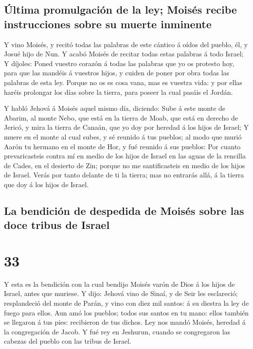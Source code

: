 \hypertarget{uxfaltima-promulgaciuxf3n-de-la-ley-moisuxe9s-recibe-instrucciones-sobre-su-muerte-inminente}{%
\subsection{Última promulgación de la ley; Moisés recibe instrucciones
sobre su muerte
inminente}\label{uxfaltima-promulgaciuxf3n-de-la-ley-moisuxe9s-recibe-instrucciones-sobre-su-muerte-inminente}}

 Y vino Moisés, y recitó todas las palabras de este cántico
á oídos del pueblo, él, y Josué hijo de Nun.  Y acabó
Moisés de recitar todas estas palabras á todo Israel;  Y
díjoles: Poned vuestro corazón á todas las palabras que yo os protesto
hoy, para que las mandéis á vuestros hijos, y cuiden de poner por obra
todas las palabras de esta ley.  Porque no os es cosa vana,
mas es vuestra vida: y por ellas haréis prolongar los días sobre la
tierra, para poseer la cual pasáis el Jordán.

 Y habló Jehová á Moisés aquel mismo día, diciendo:
 Sube á este monte de Abarim, al monte Nebo, que está en la
tierra de Moab, que está en derecho de Jericó, y mira la tierra de
Canaán, que yo doy por heredad á los hijos de Israel;  Y
muere en el monte al cual subes, y sé reunido á tus pueblos; al modo que
murió Aarón tu hermano en el monte de Hor, y fué reunido á sus pueblos:
 Por cuanto prevaricasteis contra mí en medio de los hijos
de Israel en las aguas de la rencilla de Cades, en el desierto de Zin;
porque no me santificasteis en medio de los hijos de Israel.
 Verás por tanto delante de ti la tierra; mas no entrarás
allá, á la tierra que doy á los hijos de Israel.

\hypertarget{la-bendiciuxf3n-de-despedida-de-moisuxe9s-sobre-las-doce-tribus-de-israel}{%
\subsection{La bendición de despedida de Moisés sobre las doce tribus de
Israel}\label{la-bendiciuxf3n-de-despedida-de-moisuxe9s-sobre-las-doce-tribus-de-israel}}

\hypertarget{section-32}{%
\section{33}\label{section-32}}

 Y esta es la bendición con la cual bendijo Moisés varón de
Dios á los hijos de Israel, antes que muriese.  Y dijo:
Jehová vino de Sinaí, y de Seir les esclareció; resplandeció del monte
de Parán, y vino con diez mil santos: á su diestra la ley de fuego para
ellos.  Aun amó los pueblos; todos sus santos en tu mano:
ellos también se llegaron á tus pies: recibieron de tus dichos.
 Ley nos mandó Moisés, heredad á la congregación de Jacob.
 Y fué rey en Jeshurun, cuando se congregaron las cabezas
del pueblo con las tribus de Israel.

